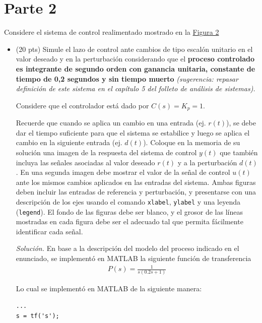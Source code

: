 \section*{Parte 2}

Considere el sistema de control realimentado mostrado en la \href{figdb}{Figura 2}



\begin{itemize}
\item (20 pts) Simule el lazo de control ante cambios de tipo escalón unitario en el valor
deseado y en la perturbación considerando que el \textbf{proceso controlado es integrante
de segundo orden con ganancia unitaria, constante de tiempo de 0,2 segundos y
sin tiempo muerto} \textit{(sugerencia: repasar definición de este sistema en el capítulo 5 del
folleto de análisis de sistemas).}

Considere que el controlador está dado por $C(s) = K_p = 1$.

Recuerde que cuando se aplica un cambio en una entrada (ej. $r(t)$), se debe dar el
tiempo suficiente para que el sistema se estabilice y luego se aplica el cambio en la
siguiente entrada (ej. $d(t)$). Coloque en la memoria de su solución una imagen de la
respuesta del sistema de control $y(t)$ que también incluya las señales asociadas
al valor deseado $r(t)$ y a la perturbación $d(t)$. En una segunda imagen debe mostrar
el valor de la señal de control $u(t)$ ante los mismos cambios aplicados en las entradas
del sistema. Ambas figuras deben incluir las entradas de referencia y perturbación, y
presentarse con una descripción de los ejes usando el comando \texttt{xlabel}, \texttt{ylabel} y una
leyenda (\texttt{legend}). El fondo de las figuras debe ser blanco, y el grosor de las líneas
mostradas en cada figura debe ser el adecuado tal que permita fácilmente identificar
cada señal.

\vspace{1em}

    \textit{Solución.} En base a la descripción del modelo del proceso indicado en el enunciado, se implementó en MATLAB la siguiente función de transferencia
\begin{align*}
    P(s) = \frac{1}{s(0.2s+1)}
\end{align*}

Lo cual se implementó en MATLAB de la siguiente manera:

\vspace{1em}

\begin{mdframed}
\begin{verbatim}
...
s = tf('s');


\end{verbatim}
\end{mdframed}
\end{itemize}
